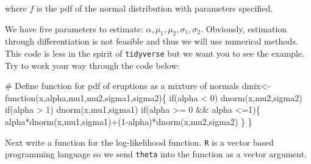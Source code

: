 \documentclass[
  letterpaper,
  DIV=11,
  numbers=noendperiod]{scrreprt}
\newenvironment{Shaded}{\begin{snugshade}}{\end{snugshade}}
\newcommand{\CommentTok}[1]{\textcolor[rgb]{0.37,0.37,0.37}{#1}}
\newcommand{\ControlFlowTok}[1]{\textcolor[rgb]{0.00,0.23,0.31}{#1}}
\newcommand{\DecValTok}[1]{\textcolor[rgb]{0.68,0.00,0.00}{#1}}
\newcommand{\FunctionTok}[1]{\textcolor[rgb]{0.28,0.35,0.67}{#1}}
\newcommand{\NormalTok}[1]{\textcolor[rgb]{0.00,0.23,0.31}{#1}}
\newcommand{\OtherTok}[1]{\textcolor[rgb]{0.00,0.23,0.31}{#1}}
\newcommand{\SpecialCharTok}[1]{\textcolor[rgb]{0.37,0.37,0.37}{#1}}
\begin{document}
where \(f\) is the pdf of the normal distribution with parameters
specified.

We have five parameters to estimate:
\(\alpha, \mu_1, \mu_2, \sigma_1, \sigma_2\). Obviously, estimation
through differentiation is not feasible and thus we will use numerical
methods. This code is less in the spirit of \texttt{tidyverse} but we
want you to see the example. Try to work your way through the code
below:

\begin{Shaded}
\begin{Highlighting}[]
\CommentTok{\# Define function for pdf of eruptions as a mixture of normals}
\NormalTok{dmix}\OtherTok{\textless{}{-}}\ControlFlowTok{function}\NormalTok{(x,alpha,mu1,mu2,sigma1,sigma2)\{}
  \ControlFlowTok{if}\NormalTok{(alpha }\SpecialCharTok{\textless{}} \DecValTok{0}\NormalTok{) }\FunctionTok{dnorm}\NormalTok{(x,mu2,sigma2)}
  \ControlFlowTok{if}\NormalTok{(alpha }\SpecialCharTok{\textgreater{}} \DecValTok{1}\NormalTok{) }\FunctionTok{dnorm}\NormalTok{(x,mu1,sigma1)}
  \ControlFlowTok{if}\NormalTok{(alpha }\SpecialCharTok{\textgreater{}=} \DecValTok{0} \SpecialCharTok{\&\&}\NormalTok{ alpha }\SpecialCharTok{\textless{}=}\DecValTok{1}\NormalTok{)\{}
\NormalTok{    alpha}\SpecialCharTok{*}\FunctionTok{dnorm}\NormalTok{(x,mu1,sigma1)}\SpecialCharTok{+}\NormalTok{(}\DecValTok{1}\SpecialCharTok{{-}}\NormalTok{alpha)}\SpecialCharTok{*}\FunctionTok{dnorm}\NormalTok{(x,mu2,sigma2)}
\NormalTok{  \}}
\NormalTok{\}}
\end{Highlighting}
\end{Shaded}

Next write a function for the log-likelihood function. \texttt{R} is a
vector based programming language so we send \texttt{theta} into the
function as a vector argument.
\end{document}
